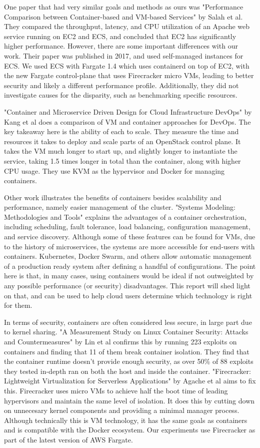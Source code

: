 \documentclass[11pt]{article}
\begin{document}
One paper that had very similar goals and methods as ours was "Performance Comparison between Container-based and VM-based Services" by Salah et al. They compared the throughput, latency, and CPU utilization of an Apache web service running on EC2 and ECS, and concluded that EC2 has significantly higher performance. However, there are some important differences with our work. Their paper was published in 2017, and used self-managed instances for ECS. We used ECS with Fargate 1.4 which uses containerd on top of EC2, with the new Fargate control-plane that uses Firecracker micro VMs, leading to better security and likely a different performance profile. Additionally, they did not investigate causes for the disparity, such as benchmarking specific resources.

"Container and Microservice Driven Design for Cloud Infrastructure DevOps" by Kang et al does a comparison of VM and container approaches for DevOps. The key takeaway here is the ability of each to scale. They measure the time and resources it takes to deploy and scale parts of an OpenStack control plane. It takes the VM much longer to start up, and slightly longer to instantiate the service, taking 1.5 times longer in total than the container, along with higher CPU usage. They use KVM as the hypervisor and Docker for managing containers.

Other work illustrates the benefits of containers besides scalability and performance, namely easier management of the cluster. "Systems Modeling: Methodologies and Tools" explains the advantages of a container orchestration, including scheduling, fault tolerance, load balancing, configuration management, and service discovery. Although some of these features can be found for VMs, due to the history of microservices, the systems are more accessible for end-users with containers. Kubernetes, Docker Swarm, and others allow automatic management of a production ready system after defining a handful of configurations. The point here is that, in many cases, using containers would be ideal if not outweighted by any possible performance (or security) disadvantages. This report will shed light on that, and can be used to help cloud users determine which technology is right for them.

In terms of security, containers are often considered less secure, in large part due to kernel sharing. "A Measurement Study on Linux Container Security: Attacks and
Countermeasures" by Lin et al confirms this by running 223 exploits on containers and finding that 11 of them break container isolation. They find that the container runtime doesn't provide enough security, as over 50\% of 88 exploits they tested in-depth ran on both the host and inside the container. "Firecracker: Lightweight Virtualization
for Serverless Applications" by Agache et al aims to fix this. Firecracker uses micro VMs to achieve half the boot time of leading hypervisors and maintain the same level of isolation. It does this by cutting down on unnecesary kernel components and providing a minimal manager process. Although technically this is VM technology, it has the same goals as containers and is compatible with the Docker ecosystem. Our experiments use Firecracker as part of the latest version of AWS Fargate.
\end{document}
